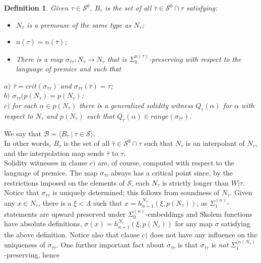 \documentclass[12pt]{article}
\newtheorem{defn}[thm]{Definition}
\begin{document}
\begin{defn} \label{B-tau sequence on S^0}
Given $\tau \in \mathcal{S}^0$, $B_\tau$ is the set of all $\bar{\tau} \in \mathcal{S}^0 \cap \tau$ satisfying:\\

\begin{itemize}
\item{$N_{\bar{\tau}}$ is a premouse of the same type as $N_\tau$;}
\item{$n(\tau) = n(\bar{\tau})$;}
\item{There is a map $\sigma_{\bar{\tau} \tau } : N_{\bar{\tau}} \longrightarrow N_\tau$ that is $\Sigma_0^{n(\tau)}$-preserving with respect to the language of premice and such that}
\end{itemize}

\indent \indent $a)$ $\bar{\tau} = crit (\sigma_{\bar{\tau} \tau })$ and $\sigma_{\bar{\tau} \tau } (\bar{\tau}) = \tau $;\\

\indent \indent $b)$ $\sigma_{\bar{\tau} \tau } (p ( N_{\bar{\tau}}) = p ( N_\tau)$;\\

\indent \indent $c)$ for each $\alpha \in p( N_\tau )$ there is a generalized solidity witness $Q_\tau (\alpha )$ for $\alpha$ with respect to $N_\tau$ and $p(N_\tau)$ such that $Q_\tau (\alpha ) \in range ( \sigma_{\bar{\tau} \tau } )$.\\
\end{defn}

We say that $\mathcal{B} = \langle B_\tau \ | \ \tau \in \mathcal{S} \rangle$.\\

In other words, $B_\tau$ is the set of all $\bar{\tau} \in \mathcal{S}^0 \cap \tau$ such that $N_{\bar{\tau}}$ is an interpolant of $N_\tau$, and the interpolation map sends $\bar{\tau}$ to $\tau$.\\

Solidity witnesses in clause $c)$ are, of course, computed with respect to the language of premice.  The map $\sigma_{\bar{\tau} \tau }$ always has a critical point since, by the restrictions imposed on the elements of $\mathcal{S}$, each $N_\tau$ is strictly longer than $W | \tau$.  Notice that $\sigma_{\bar{\tau} \tau }$ is uniquely determined; this follows from soundness of $N_{\bar{\tau}}$.  Given any $x \in N_{\bar{\tau}}$, there is a $\xi < \Lambda$ such that $x = h_{n+1}^{N_{\bar{\tau}}} (\xi , p (N_{\bar{\tau}}))$; as $\Sigma_1^{(n)}$-statements are upward preserved under $\Sigma_0^{(n)}$-embeddings and Skolem functions have absolute definitions, $\sigma (x) = h_{n+1}^{N_{\tau}} (\xi , p (N_\tau))$ for any map $\sigma$ satisfying the above definition.  Notice also that clause $c)$ does not have any influence on the uniqueness of $\sigma_{\bar{\tau} \tau }$.  One further important fact about $\sigma_{\bar{\tau} \tau }$ is that $\sigma_{\bar{\tau} \tau }$ is \textit{not} $\Sigma_1^{(n(N_\tau)}$-preserving, hence
\end{document}
